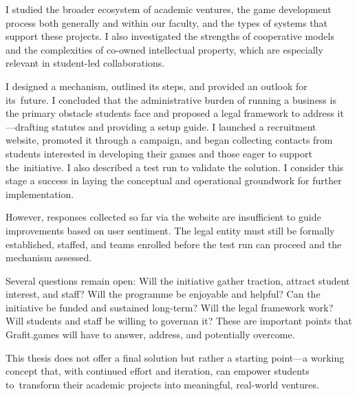 I studied the broader ecosystem of academic ventures, the game development process both generally and within our faculty, and the types of systems that support these projects. I also investigated the strengths of cooperative models and the complexities of co-owned intellectual property, which are especially relevant in student-led collaborations.

I designed a mechanism, outlined its steps, and provided an outlook for its~future. I concluded that the administrative burden of running a business is the primary obstacle students face and proposed a legal framework to address it—drafting statutes and providing a setup guide. I launched a recruitment website, promoted it through a campaign, and began collecting contacts from students interested in developing their games and those eager to support the~initiative. I also described a test run to validate the solution. I consider this stage a success in laying the conceptual and operational groundwork for further implementation.

However, responses collected so far via the website are insufficient to guide improvements based on user sentiment. The legal entity must still be formally established, staffed, and teams enrolled before the test run can proceed and the mechanism assessed.

Several questions remain open: Will the initiative gather traction, attract student interest, and staff? Will the programme be enjoyable and helpful? Can the initiative be funded and sustained long-term? Will the legal framework work? Will students and staff be willing to governan it? These are important points that Grafit.games will have to answer, address, and potentially overcome.

This thesis does not offer a final solution but rather a starting point---a working concept that, with continued effort and iteration, can empower students to~transform their academic projects into meaningful, real-world ventures.
